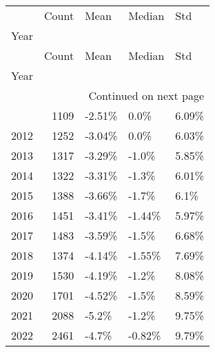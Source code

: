 \begin{longtable}{lrlll}
\toprule
 & Count & Mean & Median & Std \\
Year &  &  &  &  \\
\midrule
\endfirsthead
\toprule
 & Count & Mean & Median & Std \\
Year &  &  &  &  \\
\midrule
\endhead
\midrule
\multicolumn{5}{r}{Continued on next page} \\
\midrule
\endfoot
\bottomrule
\endlastfoot
2011 & 1109 & -2.51\% & 0.0\% & 6.09\% \\
2012 & 1252 & -3.04\% & 0.0\% & 6.03\% \\
2013 & 1317 & -3.29\% & -1.0\% & 5.85\% \\
2014 & 1322 & -3.31\% & -1.3\% & 6.01\% \\
2015 & 1388 & -3.66\% & -1.7\% & 6.1\% \\
2016 & 1451 & -3.41\% & -1.44\% & 5.97\% \\
2017 & 1483 & -3.59\% & -1.5\% & 6.68\% \\
2018 & 1374 & -4.14\% & -1.55\% & 7.69\% \\
2019 & 1530 & -4.19\% & -1.2\% & 8.08\% \\
2020 & 1701 & -4.52\% & -1.5\% & 8.59\% \\
2021 & 2088 & -5.2\% & -1.2\% & 9.75\% \\
2022 & 2461 & -4.7\% & -0.82\% & 9.79\% \\
\end{longtable}
